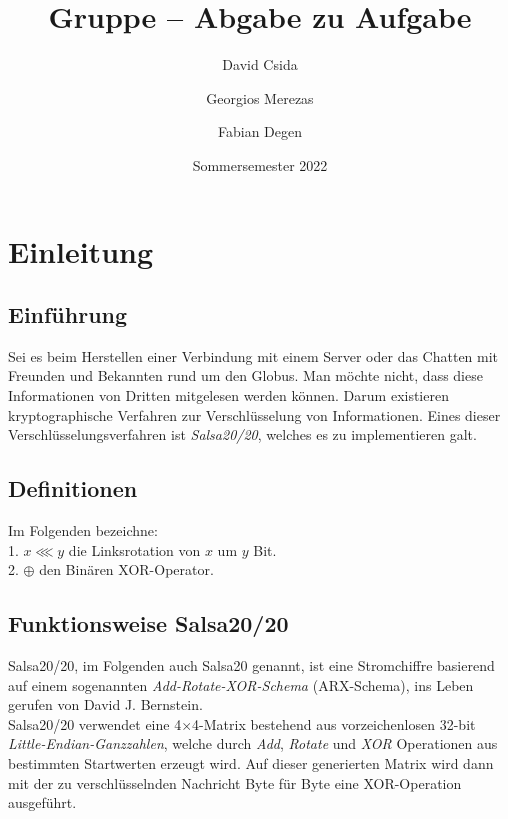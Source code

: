 \documentclass[course=erap]{aspdoc}
\author{David Csida \and Georgios Merezas \and Fabian Degen}
\date{Sommersemester 2022} %
\title{Gruppe \theGroup{} -- Abgabe zu Aufgabe \theNumber}
\begin{document}
\maketitle

\section{Einleitung}
\subsection{Einführung}
Sei es beim Herstellen einer Verbindung mit einem Server oder das Chatten mit Freunden und Bekannten rund um
den Globus. Man möchte nicht, dass diese Informationen von Dritten mitgelesen werden können. Darum existieren
kryptographische Verfahren zur Verschlüsselung von Informationen. Eines dieser Ver\-schlüsselungs\-ver\-fahren ist
\emph{Salsa20/20}, welches es zu implementieren galt.

\subsection{Definitionen}
Im Folgenden bezeichne: 
\\ \hspace*{5mm} 1. $x \lll y$ die Linksrotation von $x$ um $y$ Bit. 
\\ \hspace*{5mm} 2. $\oplus$ den Binären XOR-Operator.

\subsection{Funktionsweise Salsa20/20}
Salsa20/20, im Folgenden auch Salsa20 genannt, ist eine Stromchiffre basierend auf einem sogenannten 
\emph{Add-Rotate-XOR-Schema} (ARX-Schema), ins Leben gerufen von David J. Bernstein.\\
Salsa20/20 verwendet eine 4$\times$4-Matrix bestehend aus vorzeichenlosen 32-bit \emph{Little-Endian-Ganzzahlen},
welche durch \emph{Add}, \emph{Rotate} und \emph{XOR} Operationen aus bestimmten Startwerten erzeugt wird.
Auf dieser generierten Matrix wird dann mit der zu ver\-schlü\-ssel\-nden Nachricht Byte für 
Byte eine XOR-Operation ausgeführt.
\end{document}
